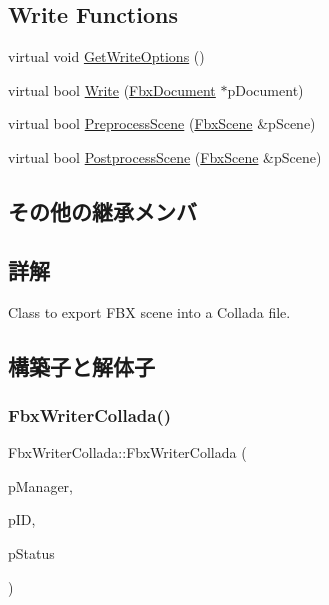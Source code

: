 \subsection*{Write Functions}
\begin{DoxyCompactItemize}
\item 
virtual void \hyperlink{class_fbx_writer_collada_a64fdc18e00335c37acf279a5ef0d3711}{Get\+Write\+Options} ()
\item 
virtual bool \hyperlink{class_fbx_writer_collada_aaf5a632f5fa72c521d578ad17ae0aea1}{Write} (\hyperlink{class_fbx_document}{Fbx\+Document} $\ast$p\+Document)
\item 
virtual bool \hyperlink{class_fbx_writer_collada_aee5b9934adfdd982e0c33373ddf77121}{Preprocess\+Scene} (\hyperlink{class_fbx_scene}{Fbx\+Scene} \&p\+Scene)
\item 
virtual bool \hyperlink{class_fbx_writer_collada_a3f03c5f945df442ecba81efa7d531c64}{Postprocess\+Scene} (\hyperlink{class_fbx_scene}{Fbx\+Scene} \&p\+Scene)
\end{DoxyCompactItemize}
\subsection*{その他の継承メンバ}


\subsection{詳解}
Class to export F\+BX scene into a Collada file. 

\subsection{構築子と解体子}
\mbox{\label{class_fbx_writer_collada_aed549791a8dec6dbeba7a6293c098cdb}} 
\subsubsection{\texorpdfstring{Fbx\+Writer\+Collada()}{FbxWriterCollada()}}
{\footnotesize\ttfamily Fbx\+Writer\+Collada\+::\+Fbx\+Writer\+Collada (\begin{DoxyParamCaption}\item[{\hyperlink{class_fbx_manager}{Fbx\+Manager} \&}]{p\+Manager,  }\item[{int}]{p\+ID,  }\item[{\hyperlink{class_fbx_status}{Fbx\+Status} \&}]{p\+Status }\end{DoxyParamCaption})}


